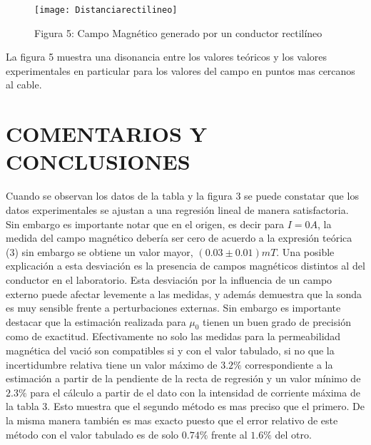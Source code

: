 \documentclass[article, 11pt]{report}
\begin{document}
 
 \begin{figure}[H]
 	\texttt{[image: Distanciarectilineo]}
 	\caption*{Figura 5: Campo Magnético generado por un conductor rectilíneo}
 \end{figure}
 
 La figura 5  muestra una disonancia entre los valores teóricos y los valores experimentales en particular para los valores del campo en puntos mas cercanos al cable.
 
 
 \section{COMENTARIOS Y CONCLUSIONES}
 
Cuando se observan los datos de la tabla y la figura 3 se puede    constatar que los datos experimentales se ajustan a una
 regresión lineal de manera satisfactoria. Sin embargo es importante notar que en el origen, es decir para $I=0A$, la medida del campo magnético debería ser cero de acuerdo a la expresión teórica (3) sin embargo se obtiene un valor mayor, $(0.03 \pm 0.01) mT$. Una posible explicación a esta desviación es la presencia de campos magnéticos distintos al del conductor en el laboratorio. Esta desviación por la influencia de un campo externo puede afectar levemente a las medidas, y además demuestra que la sonda es muy sensible frente a perturbaciones externas. Sin embargo es importante destacar que la estimación realizada para $\mu_0$ tienen un buen grado de precisión como de exactitud. Efectivamente no solo las medidas para la permeabilidad magnética del vació son compatibles si y con el valor tabulado, si no que la incertidumbre relativa tiene un valor máximo de $3.2\%$ correspondiente a la estimación a partir de la pendiente de la recta de regresión y un valor mínimo de $2.3\%$ para el cálculo a partir de el dato con la intensidad de corriente máxima de la tabla 3. Esto muestra que el segundo método es mas preciso que el primero. De la misma manera también es mas exacto puesto que el error relativo de este método con el valor tabulado es de solo $0.74\%$ frente al $1.6\%$ del otro.
 
 
 
\end{document}
